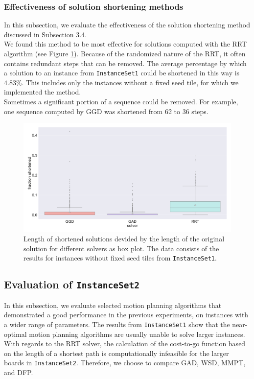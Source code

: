 \vfill

\subsubsection{Effectiveness of solution shortening methods}

In this subsection, we evaluate the effectiveness of the solution shortening method discussed in Subsection 3.4. \\
We found this method to be most effective for solutions computed with the RRT algorithm (see Figure \ref{fig:solution_shortening}).
Because of the randomized nature of the RRT, it often contains redundant steps that can be removed. The average percentage by which a solution to an instance from \texttt{InstanceSet1} could be shortened in this way is $4.83\%$. This includes only the instances without a fixed seed tile, for which we implemented the method.\\
Sometimes a significant portion of a sequence could be removed. For example, one sequence computed by GGD was shortened from 62 to 36 steps. \\

\begin{figure}[H]
\centering
\includegraphics[width=\textwidth]{figures/plots/heuristic_solvers_i1/solution_shortening.pdf}
\caption[Effectiveness of the solution shortening method]{Length of shortened solutions devided by the length of the original solution for different solvers as box plot. The data consists of the results for instances without fixed seed tiles from \texttt{InstanceSet1}.}
\label{fig:solution_shortening}
\end{figure}

\subsection{Evaluation of \texttt{InstanceSet2}}
In this subsection, we evaluate selected motion planning algorithms that demonstrated a good performance in the previous experiments, on instances with a wider range of parameters.
The results from \texttt{InstanceSet1} show that the near-optimal motion planning algorithms are usually unable to solve larger instances. With regards to the RRT solver, the calculation of the cost-to-go function based on the length of a shortest path is computationally infeasible for the larger boards in \texttt{InstanceSet2}. Therefore, we choose to compare GAD, WSD, MMPT, and DFP.

